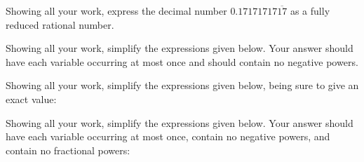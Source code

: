 \documentclass[12pt,letterpaper]{exam}
\begin{document}
\begin{questions}
\newpage
\question[10] Showing all your work, express the decimal number $0.17171717\overline{17}$ as a fully reduced rational number.



\newpage
\question Showing all your work, simplify the expressions given below. Your answer should have each variable occurring at most once and should contain no negative powers.



\newpage
\question Showing all your work, simplify the expressions given below, being sure to give an exact value:



\newpage
\question Showing all your work, simplify the expressions given below. Your answer should have each variable occurring at most once, contain no negative powers, and contain no fractional powers:
\end{questions}
\end{document}

